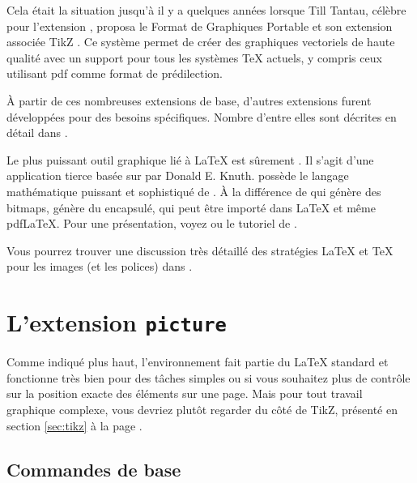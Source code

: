 Cela était la situation jusqu'à il y a quelques années lorsque Till
Tantau, célèbre pour l'extension , proposa le Format de
Graphiques Portable  et son extension associée TikZ
. Ce système permet de créer des graphiques vectoriels de
haute qualité avec un support pour tous les systèmes \TeX{} actuels, y
compris ceux utilisant pdf comme format de prédilection.

À partir de ces nombreuses extensions de base, d'autres extensions
furent développées pour des besoins spécifiques. Nombre d'entre elles
sont décrites en détail dans \graphicscompanion{}.

Le plus puissant outil graphique lié à \LaTeX{} est sûrement \MP. Il
s'agit d'une application tierce basée sur \MF{} par Donald E. Knuth.
\MP{} possède le langage mathématique puissant et sophistiqué de
\MF. À la différence de \MF{} qui génère des bitmaps, \MP{} génère du
\PSi{} encapsulé, qui peut être importé dans \LaTeX{} et même
pdf\LaTeX{}. Pour une présentation, voyez \hobby{} ou le tutoriel de
\cite{ursoswald}.

Vous pourrez trouver une discussion très détaillé des stratégies
\LaTeX{} et \TeX{} pour les images (et les polices) dans \hoenig.


\section{L'extension \texttt{picture}}

Comme indiqué plus haut, l'environnement  fait partie du
\LaTeX{} standard et fonctionne très bien pour des tâches simples ou si
vous souhaitez plus de contrôle sur la position exacte des éléments
sur une page. Mais pour tout travail graphique complexe, vous devriez
plutôt regarder du côté de TikZ, présenté en section \ref{sec:tikz} à
la page \pageref{sec:tikz}.

\subsection{Commandes de base}

